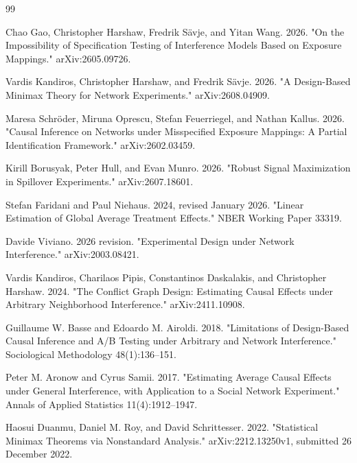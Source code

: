\documentclass{article}
\begin{document}
\begin{thebibliography}{99}

   Chao Gao, Christopher Harshaw, Fredrik Sävje, and Yitan Wang. 2026. "On the Impossibility of Specification Testing of Interference Models Based on Exposure Mappings." arXiv:2605.09726.

   Vardis Kandiros, Christopher Harshaw, and Fredrik Sävje. 2026. "A Design-Based Minimax Theory for Network Experiments." arXiv:2608.04909.

   Maresa Schröder, Miruna Oprescu, Stefan Feuerriegel, and Nathan Kallus. 2026. "Causal Inference on Networks under Misspecified Exposure Mappings: A Partial Identification Framework." arXiv:2602.03459.

   Kirill Borusyak, Peter Hull, and Evan Munro. 2026. "Robust Signal Maximization in Spillover Experiments." arXiv:2607.18601.

   Stefan Faridani and Paul Niehaus. 2024, revised January 2026. "Linear Estimation of Global Average Treatment Effects." NBER Working Paper 33319.

   Davide Viviano. 2026 revision. "Experimental Design under Network Interference." arXiv:2003.08421.

   Vardis Kandiros, Charilaos Pipis, Constantinos Daskalakis, and Christopher Harshaw. 2024. "The Conflict Graph Design: Estimating Causal Effects under Arbitrary Neighborhood Interference." arXiv:2411.10908.

   Guillaume W. Basse and Edoardo M. Airoldi. 2018. "Limitations of Design-Based Causal Inference and A/B Testing under Arbitrary and Network Interference." Sociological Methodology 48(1):136--151.

   Peter M. Aronow and Cyrus Samii. 2017. "Estimating Average Causal Effects under General Interference, with Application to a Social Network Experiment." Annals of Applied Statistics 11(4):1912--1947.

   Haosui Duanmu, Daniel M. Roy, and David Schrittesser. 2022. "Statistical Minimax Theorems via Nonstandard Analysis." arXiv:2212.13250v1, submitted 26 December 2022.

\end{thebibliography}
\end{document}
